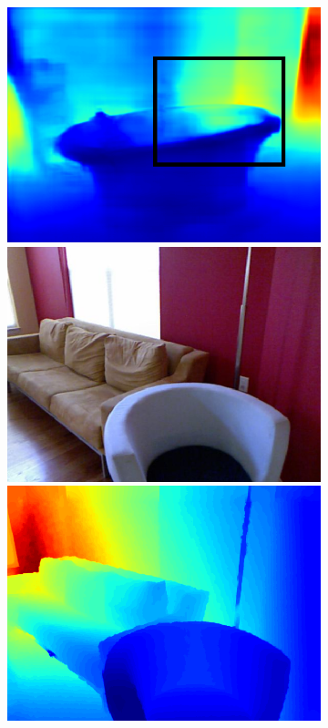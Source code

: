 \begin{figure}[htb]
\begin{subfigure}{0.15\linewidth}
\begin{minipage}[t]{1\linewidth}
  \includegraphics[width=1\linewidth]{figure/nyu_without/bathroom_rgb_00668.png}
  \includegraphics[width=1\linewidth]{figure/nyu_rgb/1313.png}
  \includegraphics[width=1\linewidth]{figure/nyu_gt/1313.png}

\end{minipage}
\end{subfigure}
\end{figure}
